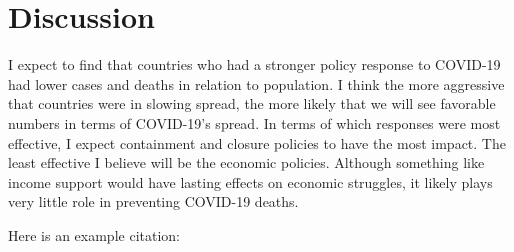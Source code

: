 \documentclass[12pt, letterpaper, titlepage]{article}
\begin{document}
\hypertarget{sec:disc}{%
\section{Discussion}\label{sec:disc}}

I expect to find that countries who had a stronger policy response to COVID-19 had lower cases and deaths in relation to population. I think the more aggressive that countries were in slowing spread, the more likely that we will see favorable numbers in terms of COVID-19’s spread. In terms of which responses were most effective, I expect containment and closure policies to have the most impact. The least effective I believe will be the economic policies. Although something like income support would have lasting effects on economic struggles, it likely plays very little role in preventing COVID-19 deaths.

Here is an example citation: \citet{Steinskog}



\end{document}
